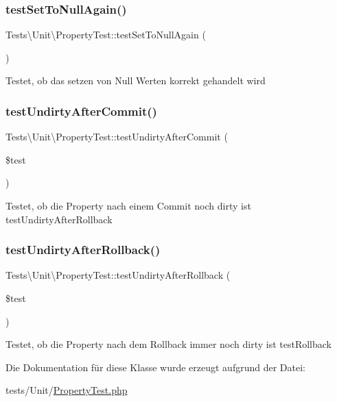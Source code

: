 \subsubsection{\texorpdfstring{test\+Set\+To\+Null\+Again()}{testSetToNullAgain()}}
{\footnotesize\ttfamily Tests\textbackslash{}\+Unit\textbackslash{}\+Property\+Test\+::test\+Set\+To\+Null\+Again (\begin{DoxyParamCaption}{ }\end{DoxyParamCaption})}

Testet, ob das setzen von Null Werten korrekt gehandelt wird \mbox{\label{classTests_1_1Unit_1_1PropertyTest_a035c61c8919cbe4279fe435eac24b8e7}} 
\subsubsection{\texorpdfstring{test\+Undirty\+After\+Commit()}{testUndirtyAfterCommit()}}
{\footnotesize\ttfamily Tests\textbackslash{}\+Unit\textbackslash{}\+Property\+Test\+::test\+Undirty\+After\+Commit (\begin{DoxyParamCaption}\item[{}]{\$test }\end{DoxyParamCaption})}

Testet, ob die Property nach einem Commit noch dirty ist  test\+Undirty\+After\+Rollback \mbox{\label{classTests_1_1Unit_1_1PropertyTest_af4e052a564d26df4b6dabdbbd636abba}} 
\subsubsection{\texorpdfstring{test\+Undirty\+After\+Rollback()}{testUndirtyAfterRollback()}}
{\footnotesize\ttfamily Tests\textbackslash{}\+Unit\textbackslash{}\+Property\+Test\+::test\+Undirty\+After\+Rollback (\begin{DoxyParamCaption}\item[{}]{\$test }\end{DoxyParamCaption})}

Testet, ob die Property nach dem Rollback immer noch dirty ist  test\+Rollback 

Die Dokumentation für diese Klasse wurde erzeugt aufgrund der Datei\+:\begin{DoxyCompactItemize}
\item 
tests/\+Unit/\hyperlink{PropertyTest_8php}{Property\+Test.\+php}\end{DoxyCompactItemize}
